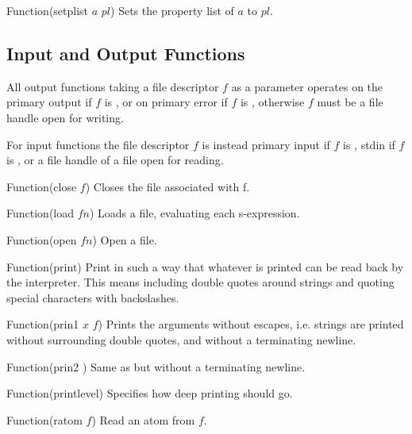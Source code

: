 \begin{defun}{Function}{(setplist $a$ $pl$)}
  Sets the property list of $a$ to $pl$.
\end{defun}

\subsection{Input and Output Functions}
All output functions taking a file descriptor $f$ as a parameter
operates on the primary output if $f$ is \NIL, or on primary error if
$f$ is \T, otherwise $f$ must be a file handle open for writing.

For input functions the file descriptor $f$ is instead primary input
if $f$ is \NIL, stdin if $f$ is \T, or a file handle of a file open
for reading.

\begin{defun}{Function}{(close $f$)}
  Closes the file associated with f.
\end{defun}

\begin{defun}{Function}{(load $fn$)}
  Loads a file, evaluating each s-expression.
\end{defun}

\begin{defun}{Function}{(open $fn$)}
  Open a file.
\end{defun}

\begin{defun}{Function}{(print)}
  Print in such a way that whatever is printed can be read back by the
  interpreter. This means including double quotes around strings and
  quoting special characters with backslashes.
\end{defun}


\begin{defun}{Function}{(prin1 $x$ $f$)}
  Prints the arguments without escapes, i.e. strings are printed
  without surrounding double quotes, and without a terminating
  newline.
\end{defun}

\begin{defun}{Function}{(prin2 \xargs)}
  Same as  but without a terminating newline.
\end{defun}

\begin{defun}{Function}{(printlevel)}
  Specifies how deep printing should go.
\end{defun}

\begin{defun}{Function}{(ratom $f$)}
  Read an atom from $f$.
\end{defun}

